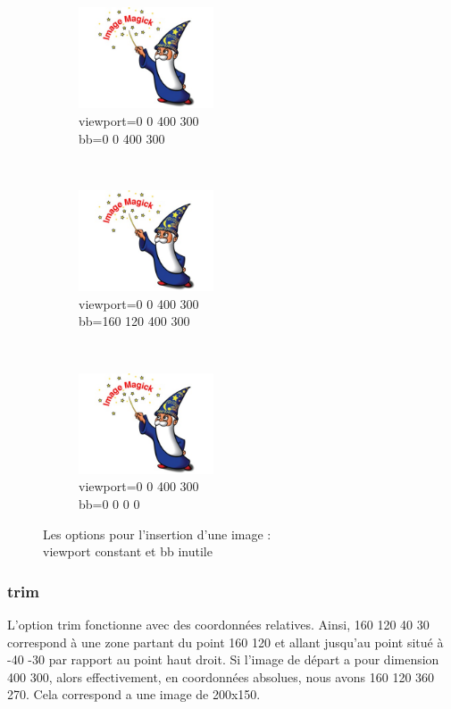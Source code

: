 \documentclass[french]{article}
\begin{document}
\begin{figure}[h]
    \centering
    \begin{subfigure}[b]{0.3\textwidth}
        \includegraphics[viewport=0 0 400 300,bb=0 0 400 300,width=4cm,height=3cm,clip=true]{test.jpg}
        \caption{viewport=0 0 400 300\\bb=0 0 400 300}
        \label{essai_a}
    \end{subfigure}
    ~
    \begin{subfigure}[b]{0.3\textwidth}
        \includegraphics[viewport=0 0 400 300,bb=160 120 400 300,width=4cm,height=3cm,clip=true]{test.jpg}
        \caption{viewport=0 0 400 300\\bb=160 120 400 300}
        \label{essai_2}
    \end{subfigure}
    ~
    \begin{subfigure}[b]{0.3\textwidth}
        \includegraphics[viewport=0 0 400 300,bb=0 0 0 0,width=4cm,height=3cm,clip=true]{test.jpg}
        \caption{viewport=0 0 400 300\\bb=0 0 0 0}
        \label{essai_3}
    \end{subfigure}
    \caption{Les options pour l'insertion d'une image :\\viewport constant et bb inutile}%
    \label{viewport constant et bb inutile}

\end{figure}

\subsubsection{trim}
L'option trim fonctionne avec des coordonnées relatives.
Ainsi, {160 120 40 30} correspond à une zone partant du point {160 120}
et allant jusqu'au point situé à {-40 -30} par rapport au point haut droit.
Si l'image de départ a pour dimension {400 300}, alors effectivement, 
en coordonnées absolues, nous avons {160 120 360 270}.
Cela correspond a une image de 200x150.
\end{document}
